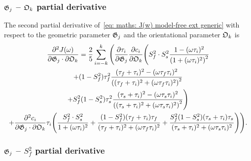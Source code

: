 \subsubsection{$\mathfrak{G}_j$ -- $\mathfrak{O}_k$ partial derivative}

The second partial derivative of~\eqref{eq: maths: J(w) model-free ext generic} with respect to the geometric parameter $\mathfrak{G}_j$ and the orientational parameter $\mathfrak{O}_k$ is
\begin{multline}
    \frac{\partial^2 J(\omega)}{\partial \mathfrak{G}_j \cdot \partial \mathfrak{O}_k} = \frac{2}{5} \sum_{i=-k}^k \Bigg(
        \frac{\partial \tau_i}{\partial \mathfrak{G}_j} \frac{\partial c_i}{\partial \mathfrak{O}_k} \Bigg(
            S^2_f \cdot S^2_s \frac{1 - (\omega \tau_i)^2}{\left(1 + (\omega \tau_i)^2 \right)^2} \\
            + (1 - S^2_f) \tau_f^2 \frac{(\tau_f + \tau_i)^2 - (\omega \tau_f \tau_i)^2}{\left((\tau_f + \tau_i)^2 + (\omega \tau_f \tau_i)^2 \right)^2} \\
            + S^2_f(1 - S^2_s) \tau_s^2 \frac{(\tau_s + \tau_i)^2 - (\omega \tau_s \tau_i)^2}{\left((\tau_s + \tau_i)^2 + (\omega \tau_s \tau_i)^2 \right)^2}
        \Bigg) \\
        +  \frac{\partial^2 c_i}{\partial \mathfrak{G}_j \cdot \partial \mathfrak{O}_k} \tau_i \Bigg(
            \frac{S^2_f \cdot S^2_s}{1 + (\omega \tau_i)^2}
            + \frac{(1 - S^2_f)(\tau_f + \tau_i)\tau_f}{(\tau_f + \tau_i)^2 + (\omega \tau_f \tau_i)^2}
            + \frac{S^2_f(1 - S^2_s)(\tau_s + \tau_i)\tau_s}{(\tau_s + \tau_i)^2 + (\omega \tau_s \tau_i)^2}
        \Bigg)
    \Bigg).
\end{multline}



\subsubsection{$\mathfrak{G}_j$ -- $S^2_f$ partial derivative}


